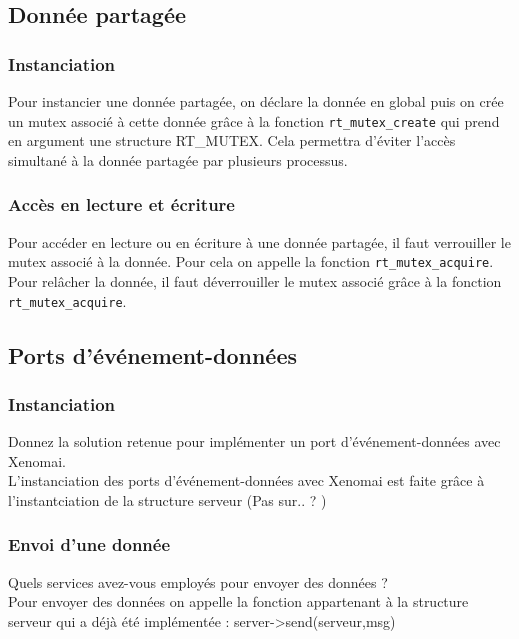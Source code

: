 \documentclass[11pt, a4paper]{paper}
\begin{document}
\subsection{Donnée partagée}

\subsubsection{Instanciation}
 {\color{black} Pour instancier une donnée partagée, on déclare la donnée en global puis on crée un mutex associé à cette donnée grâce à la fonction {\tt rt\_mutex\_create} qui prend en argument une structure RT\_MUTEX. Cela permettra d'éviter l'accès simultané à la donnée partagée par plusieurs processus.}

\subsubsection{Accès en lecture et écriture}
 {\color{black} Pour accéder en lecture ou en écriture à une donnée partagée, il faut verrouiller le mutex associé à la donnée. Pour cela on appelle la fonction {\tt rt\_mutex\_acquire}. Pour relâcher la donnée, il faut déverrouiller le mutex associé grâce à la fonction {\tt rt\_mutex\_acquire}. }

\subsection{Ports d’événement-données}

\subsubsection{Instanciation}
 {\color{blue} Donnez la solution retenue pour implémenter un port d'événement-données avec Xenomai.}
\\L'instanciation des ports d'événement-données avec Xenomai est faite grâce à l'instantciation de la structure serveur (Pas sur.. ? ) 

\subsubsection{Envoi d’une donnée}
 {\color{blue} Quels services avez-vous employés pour envoyer des données ?}
\\Pour envoyer des données on appelle la fonction appartenant à la structure serveur qui a déjà été implémentée : {server->send(serveur,msg)}
\end{document}
